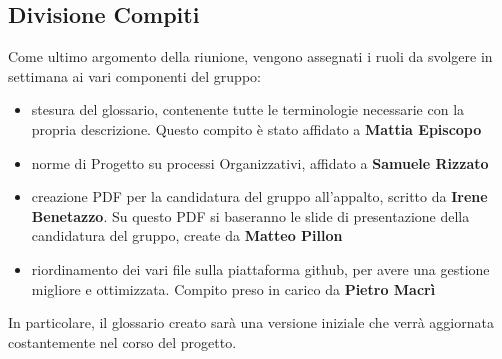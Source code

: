 \subsection{Divisione Compiti}
Come ultimo argomento della riunione, vengono assegnati i ruoli da svolgere in settimana ai vari componenti del gruppo:
 \begin{itemize}
 	\item stesura del glossario, contenente tutte le terminologie necessarie con la propria descrizione. Questo compito è stato affidato a \textbf{Mattia Episcopo} 
 	\item norme di Progetto su processi Organizzativi, affidato a \textbf{Samuele Rizzato} 
 	\item creazione PDF per la candidatura del gruppo all'appalto, scritto da \textbf{Irene Benetazzo}. Su questo PDF si baseranno le slide di presentazione della candidatura del gruppo, create da \textbf{Matteo Pillon} 
 	\item riordinamento dei vari file sulla piattaforma github, per avere una gestione migliore e ottimizzata. Compito preso in carico da \textbf{Pietro Macrì}
 \end{itemize}
In particolare, il glossario creato sarà una versione iniziale che verrà aggiornata costantemente nel corso del progetto.



